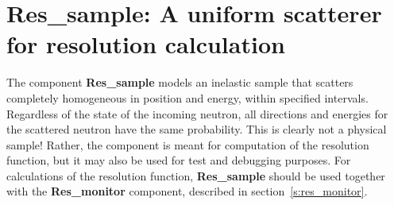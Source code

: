 
\section{Res\_sample: A uniform scatterer for resolution calculation}
\label{s:res_sample}


The component \textbf{Res\_sample} models an inelastic sample that
scatters completely homogeneous in position and energy,
within specified intervals. Regardless of
the state of the incoming neutron, all directions and energies for the
scattered neutron have the same probability. This is clearly
not a physical sample! Rather, the component is meant
for computation of the resolution function, but it may also be used
for test and debugging purposes. For calculations of the resolution
function, {\bf Res\_sample} should be used
together with the \textbf{Res\_monitor} component, described in
section~\ref{s:res_monitor}.


